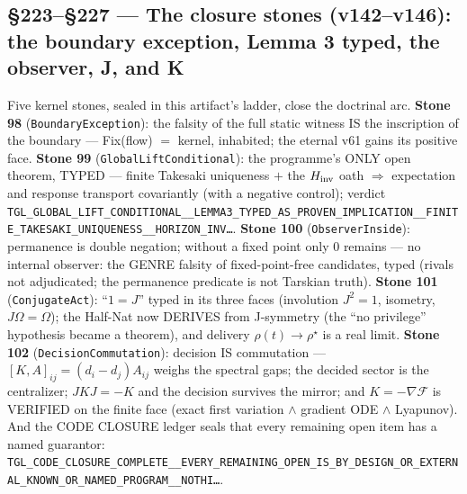 \documentclass[11pt]{article}
\theoremstyle{definition}\newtheorem{deriv}{Derivation}
\begin{document}
\subsection*{\S223--\S227 --- The closure stones (v142--v146): the boundary exception, Lemma 3 typed, the observer, J, and K}Five kernel stones, sealed in this artifact's ladder, close the doctrinal arc. \textbf{Stone 98} (\texttt{BoundaryException}): the falsity of the full static witness IS the inscription of the boundary --- Fix(flow) $=$ kernel, inhabited; the eternal v61 gains its positive face. \textbf{Stone 99} (\texttt{GlobalLiftConditional}): the programme's ONLY open theorem, TYPED --- finite Takesaki uniqueness $+$ the $H_{\rm inv}$ oath $\Rightarrow$ expectation and response transport covariantly (with a negative control); verdict \texttt{TGL\_GLOBAL\_LIFT\_CONDITIONAL\_\_LEMMA3\_TYPED\_AS\_PROVEN\_IMPLICATION\_\_FINITE\_TAKESAKI\_UNIQUENESS\_\_HORIZON\_INV\ldots}. \textbf{Stone 100} (\texttt{ObserverInside}): permanence is double negation; without a fixed point only $0$ remains --- no internal observer: the GENRE falsity of fixed-point-free candidates, typed (rivals not adjudicated; the permanence predicate is not Tarskian truth). \textbf{Stone 101} (\texttt{ConjugateAct}): ``$1{=}J$'' typed in its three faces (involution $J^2{=}1$, isometry, $J\Omega{=}\Omega$); the Half-Nat now DERIVES from J-symmetry (the ``no privilege'' hypothesis became a theorem), and delivery $\rho(t)\to\rho^\star$ is a real limit. \textbf{Stone 102} (\texttt{DecisionCommutation}): decision IS commutation --- $[K,A]_{ij}=(d_i-d_j)A_{ij}$ weighs the spectral gaps; the decided sector is the centralizer; $JKJ=-K$ and the decision survives the mirror; and $K=-\nabla\mathcal F$ is VERIFIED on the finite face (exact first variation $\wedge$ gradient ODE $\wedge$ Lyapunov). And the CODE CLOSURE ledger seals that every remaining open item has a named guarantor: \texttt{TGL\_CODE\_CLOSURE\_COMPLETE\_\_EVERY\_REMAINING\_OPEN\_IS\_BY\_DESIGN\_OR\_EXTERNAL\_KNOWN\_OR\_NAMED\_PROGRAM\_\_NOTHI\ldots}.
\end{document}
